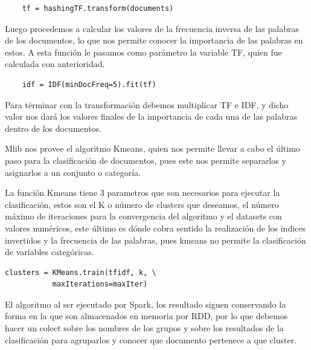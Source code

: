 \documentclass[conference,compsoc]{IEEEtran}
\begin{document}
\begin{lstlisting}
    tf = hashingTF.transform(documents)
\end{lstlisting}

\vspace{0.5cm}

Luego procedemos a calcular los valores de la frecuencia inversa de las palabras de los documentos, lo que nos permite conocer la importancia de las palabras en estos. A esta función le pasamos como parámetro la variable TF, quien fue calculada con anterioridad.\\

\vspace{0.5cm}

\begin{lstlisting}
    idf = IDF(minDocFreq=5).fit(tf)
\end{lstlisting}

\vspace{0.5cm}

Para términar con la transformación debemos multiplicar TF e IDF, y dicho valor nos dará los valores finales de la importancia de cada una de las palabras dentro de los documentos.

Mlib nos provee el algoritmo Kmeans, quien nos permite llevar a cabo el último paso para la clasificación de documentos, pues este nos permite separarlos y asignarlos a un conjunto o categoría.

La función Kmeans tiene 3 parametros que son necesarios para ejecutar la clasificación, estos son el K o número de clusters que deseamos, el número máximo de iteraciones para la convergencia del algoritmo y el datasets con valores numéricos, este último es dónde cobra sentido la realización de los indices invertidos y la frecuencia de las palabras, pues kmeans no permite la clasificación de variables categóricas.

\vspace{0.5cm}

\begin{lstlisting}
clusters = KMeans.train(tfidf, k, \
		   maxIterations=maxIter)
\end{lstlisting}

\vspace{0.5cm}

El algoritmo al ser ejecutado por Spark, los resultado siguen conservando la forma en la que son almacenados en memoria por RDD, por lo que debemos hacer un colect sobre los nombres de los grupos y sobre los resultados de la clasificación para agruparlos y conocer que documento pertenece a que cluster.
\end{document}
